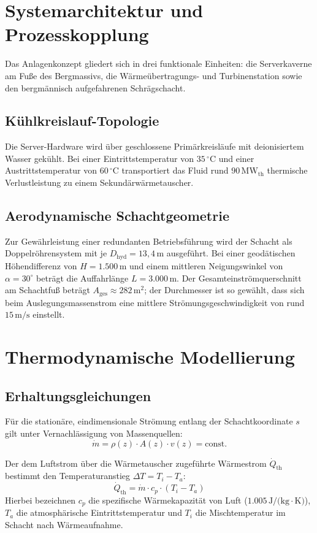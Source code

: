 \documentclass[journal]{IEEEtran}
\begin{document}
\section{Systemarchitektur und Prozesskopplung}
Das Anlagenkonzept gliedert sich in drei funktionale Einheiten: die Serverkaverne am Fuße des Bergmassivs, die Wärmeübertragungs- und Turbinenstation sowie den bergmännisch aufgefahrenen Schrägschacht.

\subsection{Kühlkreislauf-Topologie}
Die Server-Hardware wird über geschlossene Primärkreisläufe mit deionisiertem Wasser gekühlt. Bei einer Eintrittstemperatur von $35\,^\circ\text{C}$ und einer Austrittstemperatur von $60\,^\circ\text{C}$ transportiert das Fluid rund $90\,\text{MW}_{\text{th}}$ thermische Verlustleistung zu einem Sekundärwärmetauscher. 

\subsection{Aerodynamische Schachtgeometrie}
Zur Gewährleistung einer redundanten Betriebsführung wird der Schacht als Doppelröhrensystem mit je $D_{\text{hyd}} = 13{,}4\,\text{m}$ ausgeführt. Bei einer geodätischen Höhendifferenz von $H = 1.500\,\text{m}$ und einem mittleren Neigungswinkel von $\alpha = 30^\circ$ beträgt die Auffahrlänge $L = 3.000\,\text{m}$. Der Gesamteinströmquerschnitt am Schachtfuß beträgt $A_{\text{ges}} \approx 282\,\text{m}^2$; der Durchmesser ist so gewählt, dass sich beim Auslegungsmassenstrom eine mittlere Strömungsgeschwindigkeit von rund $15\,\text{m/s}$ einstellt.

\section{Thermodynamische Modellierung}

\subsection{Erhaltungsgleichungen}
Für die stationäre, eindimensionale Strömung entlang der Schachtkoordinate $s$ gilt unter Vernachlässigung von Massenquellen:
\begin{equation}
\dot{m} = \rho(z) \cdot A(z) \cdot v(z) = \text{const.}
\end{equation}

Der dem Luftstrom über die Wärmetauscher zugeführte Wärmestrom $\dot{Q}_{\text{th}}$ bestimmt den Temperaturanstieg $\Delta T = T_i - T_a$:
\begin{equation}
\dot{Q}_{\text{th}} = \dot{m} \cdot c_p \cdot (T_i - T_a)
\end{equation}
Hierbei bezeichnen $c_p$ die spezifische Wärmekapazität von Luft ($1.005\,\text{J/(kg}\cdot\text{K)}$), $T_a$ die atmosphärische Eintrittstemperatur und $T_i$ die Mischtemperatur im Schacht nach Wärmeaufnahme.
\end{document}
